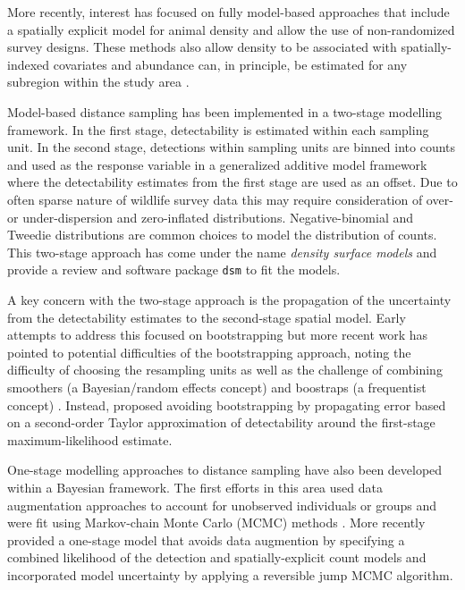 \documentclass[preprint,12pt]{elsarticle}
\begin{document}
More recently, interest has focused on fully model-based approaches that include a spatially explicit model for animal density and allow the use of non-randomized survey designs.  These methods also allow density to be associated with spatially-indexed covariates and abundance can, in principle, be estimated for any subregion within the study area \citep{johnson_model-based_2010, miller_spatial_2013, buckland_model-based_2016}.  

Model-based distance sampling has been implemented in a two-stage modelling framework.  In the first stage, detectability is estimated within each sampling unit.  In the second stage, detections within sampling units are binned into counts and used as the response variable in a generalized additive model framework where the detectability estimates from the first stage are used as an offset.  Due to often sparse nature of wildlife survey data this may require consideration of over- or under-dispersion and zero-inflated distributions.  Negative-binomial and Tweedie distributions are common choices to model the distribution of counts.  This two-stage approach has come under the name \textit{density surface models} and \cite{miller_spatial_2013} provide a review and software package \texttt{dsm} to fit the models.  

A key concern with the two-stage approach is the propagation of the uncertainty from the detectability estimates to the second-stage spatial model.  Early attempts to address this focused on bootstrapping \citep{lahiri_resampling_2003, hedley_spatial_2004} but more recent work has pointed to potential difficulties of the bootstrapping approach, noting the difficulty of choosing the resampling units as well as the challenge of combining smoothers (a Bayesian/random effects concept) and boostraps (a frequentist concept) \citep{bravington_reliable_2018-1}. Instead, \cite{bravington_reliable_2018-1}  proposed avoiding bootstrapping by propagating error based on a second-order Taylor approximation of detectability around the first-stage maximum-likelihood estimate.

One-stage modelling approaches to distance sampling have also been developed within a Bayesian framework.  The first efforts in this area used data augmentation approaches to account for unobserved individuals or groups and were fit using Markov-chain Monte Carlo (MCMC) methods \citep{royle_hierarchical_2008, schmidt_using_2012}.  More recently  \cite{oedekoven_bayesian_2014} provided a one-stage model that avoids data augmention by specifying a combined likelihood of the detection and spatially-explicit count models and incorporated model uncertainty by applying a reversible jump MCMC algorithm.
\end{document}
